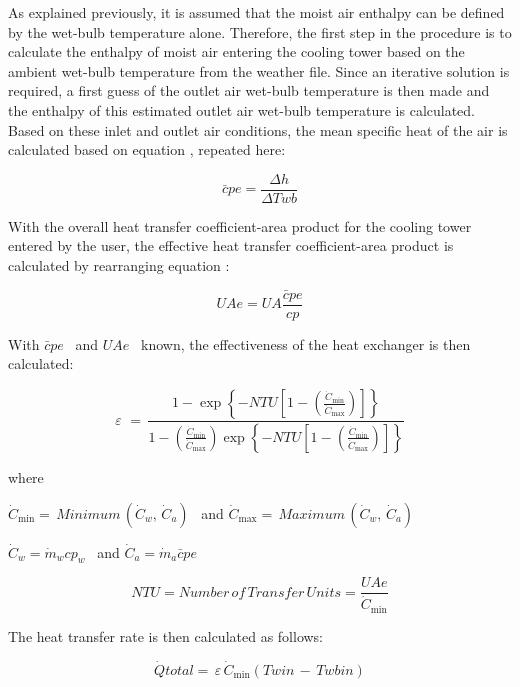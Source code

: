 As explained previously, it is assumed that the moist air enthalpy can be defined by the wet-bulb temperature alone. Therefore, the first step in the procedure is to calculate the enthalpy of moist air entering the cooling tower based on the ambient wet-bulb temperature from the weather file. Since an iterative solution is required, a first guess of the outlet air wet-bulb temperature is then made and the enthalpy of this estimated outlet air wet-bulb temperature is calculated. Based on these inlet and outlet air conditions, the mean specific heat of the air is calculated based on equation , repeated here:

\begin{equation}
\bar cpe = \frac{{\Delta h}}{{\Delta Twb}}
\end{equation}

With the overall heat transfer coefficient-area product for the cooling tower entered by the user, the effective heat transfer coefficient-area product is calculated by rearranging equation :

\begin{equation}
UAe = UA\frac{{\bar cpe}}{{cp}}
\end{equation}

With \(\bar cpe\) ~and \(UAe\) ~known, the effectiveness of the heat exchanger is then calculated:

\begin{equation}
\varepsilon \,\, = \,\frac{{1 - \exp \left\{ { - NTU\left[ {1 - \left( {\frac{{{{\dot C}_{\min }}}}{{{{\dot C}_{\max }}}}} \right)} \right]} \right\}}}{{1 - \left( {\frac{{{{\dot C}_{\min }}}}{{{{\dot C}_{\max }}}}} \right)\exp \left\{ { - NTU\left[ {1 - \left( {\frac{{{{\dot C}_{\min }}}}{{{{\dot C}_{\max }}}}} \right)} \right]} \right\}}}
\end{equation}

where

\({\dot C_{\min }} = \,Minimum\,({\dot C_w},\,{\dot C_a})\) ~and \({\dot C_{\max }} = \,Maximum\,({\dot C_w},\,{\dot C_a})\)

\({\dot C_w} = {\dot m_w}c{p_w}\) ~and \({\dot C_a} = {\dot m_a}\bar cpe\)

\begin{equation}
NTU = Number\,of\,Transfer\,Units = \frac{{UAe}}{{{{\dot C}_{\min }}}}
\end{equation}

The heat transfer rate is then calculated as follows:

\begin{equation}
\dot Qtotal = \,\varepsilon \,{\dot C_{\min }}\left( {Twin\, - \,Twbin} \right)
\end{equation}

